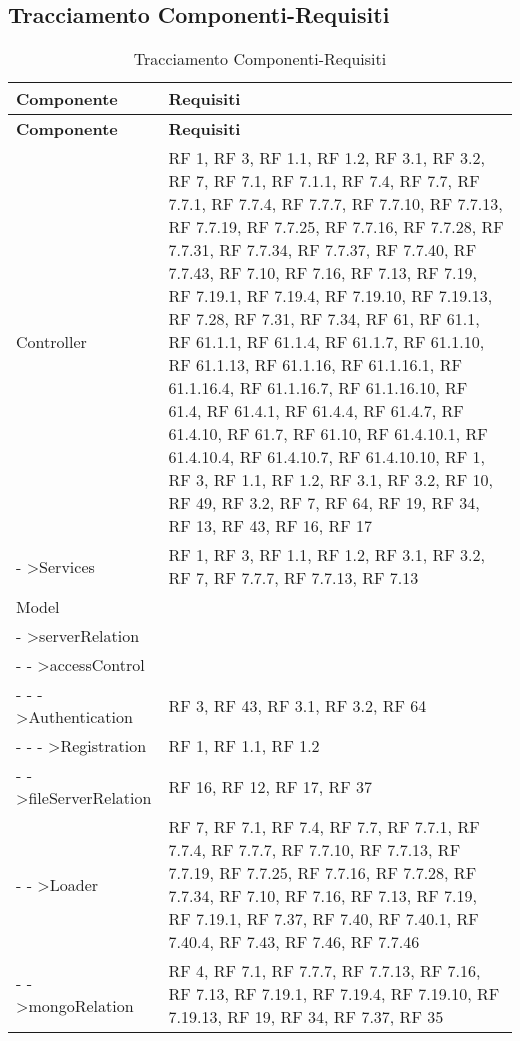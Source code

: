 \subsection{Tracciamento Componenti-Requisiti}{ 
\renewcommand*{\arraystretch}{1.4} 
\begin{longtable} [c]{| p{8cm} | p{5cm} |} 
\caption{Tracciamento Componenti-Requisiti \label{tab:traccCompReq}}\\ \hline\textbf{Componente} & \textbf{Requisiti} \\ 
\hline \endfirsthead \hline 
\textbf{Componente} & \textbf{Requisiti} \\ 
\hline \endhead \hline \endfoot \hline \endlastfoot 
Controller & RF 1, RF 3, RF 1.1, RF 1.2, RF 3.1, RF 3.2, RF 7, RF 7.1, RF 7.1.1, RF 7.4, RF 7.7, RF 7.7.1, RF 7.7.4, RF 7.7.7, RF 7.7.10, RF 7.7.13, RF 7.7.19, RF 7.7.25, RF 7.7.16, RF 7.7.28, RF 7.7.31, RF 7.7.34, RF 7.7.37, RF 7.7.40, RF 7.7.43, RF 7.10, RF 7.16, RF 7.13, RF 7.19, RF 7.19.1, RF 7.19.4, RF 7.19.10, RF 7.19.13, RF 7.28, RF 7.31, RF 7.34, RF 61, RF 61.1, RF 61.1.1, RF 61.1.4, RF 61.1.7, RF 61.1.10, RF 61.1.13, RF 61.1.16, RF 61.1.16.1, RF 61.1.16.4, RF 61.1.16.7, RF 61.1.16.10, RF 61.4, RF 61.4.1, RF 61.4.4, RF 61.4.7, RF 61.4.10, RF 61.7, RF 61.10, RF 61.4.10.1, RF 61.4.10.4, RF 61.4.10.7, RF 61.4.10.10, RF 1, RF 3, RF 1.1, RF 1.2, RF 3.1, RF 3.2, RF 10, RF 49, RF 3.2, RF 7, RF 64, RF 19, RF 34, RF 13, RF 43, RF 16, RF 17\\ 
 \hline 
- >Services &  RF 1, RF 3, RF 1.1, RF 1.2, RF 3.1, RF 3.2, RF 7, RF 7.7.7, RF 7.7.13, RF 7.13 \\ 
 \hline 
Model & \\ 
 \hline 
- >serverRelation & \\ 
 \hline 
- - >accessControl & \\ 
 \hline 
- - - >Authentication & RF 3, RF 43, RF 3.1, RF 3.2, RF 64\\ 
 \hline 
- - - >Registration & RF 1, RF 1.1, RF 1.2\\ 
 \hline 
- - >fileServerRelation & RF 16, RF 12, RF 17, RF 37\\ 
 \hline 
- - >Loader & RF 7, RF 7.1, RF 7.4, RF 7.7, RF 7.7.1, RF 7.7.4, RF 7.7.7, RF 7.7.10, RF 7.7.13, RF 7.7.19, RF 7.7.25, RF 7.7.16, RF 7.7.28, RF 7.7.34, RF 7.10, RF 7.16, RF 7.13, RF 7.19, RF 7.19.1, RF 7.37, RF 7.40, RF 7.40.1, RF 7.40.4, RF 7.43, RF 7.46, RF 7.7.46\\ 
 \hline 
- - >mongoRelation & RF 4, RF 7.1, RF 7.7.7, RF 7.7.13, RF 7.16, RF 7.13, RF 7.19.1, RF 7.19.4, RF 7.19.10, RF 7.19.13, RF 19, RF 34, RF 7.37, RF 35\\ 

\end{longtable}}
